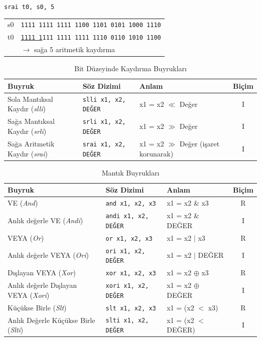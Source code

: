 \begin{center}\texttt{srai t0, s0, 5} \end{center}\vspace{-6pt}
\begin{center}
\small
\begin{tabular}{r@{\;\;}l}
  s0 & \texttt{1111\,1111\,1111\,1100\,1101\,0101\,1000\,1110} \\
  t0 & \texttt{\underline{1111\,1}111\,1111\,1111\,1110\,0110\,1010\,1100} \\
  & \hfill$\longrightarrow$ \textnormal{sağa 5 aritmetik kaydırma} \\
\end{tabular}
\end{center}

\begin{table}[htbp]
\centering
\caption{Bit Düzeyinde Kaydırma Buyrukları}
\label{tab:ari-kaydirma-buyruklar}
\begin{tabularx}{\textwidth}{l l X c}
\toprule
\textbf{Buyruk} & \textbf{Söz Dizimi} & \textbf{Anlam} & \textbf{Biçim} \\
\midrule
Sola Mantıksal Kaydır (\emph{slli}) & \texttt{slli x1, x2, DEĞER} & x1 = x2 $\ll$ Değer & I \\
Sağa Mantıksal Kaydır (\emph{srli}) & \texttt{srli x1, x2, DEĞER} & x1 = x2 $\gg$ Değer & I \\
Sağa Aritmetik Kaydır (\emph{srai}) & \texttt{srai x1, x2, DEĞER} & x1 = x2 $\gg$ Değer (işaret korunarak) & I \\
\bottomrule
\end{tabularx}
\end{table}

\begin{table}[htbp]
\centering
\caption{Mantık Buyrukları}
\label{tab:ari-mantik-buyruklar}
\begin{tabularx}{\textwidth}{l l X c}
\toprule
\textbf{Buyruk} & \textbf{Söz Dizimi} & \textbf{Anlam} & \textbf{Biçim} \\
\midrule
VE (\emph{And}) & \texttt{and x1, x2, x3} & x1 = x2 \& x3 & R \\
Anlık değerle VE (\emph{Andi}) & \texttt{andi x1, x2, DEĞER} & x1 = x2 \& DEĞER & I \\
VEYA (\emph{Or}) & \texttt{or x1, x2, x3} & x1 = x2 $|$ x3 & R \\
Anlık değerle VEYA (\emph{Ori}) & \texttt{ori x1, x2, DEĞER} & x1 = x2 $|$ DEĞER & I \\
Dışlayan VEYA (\emph{Xor}) & \texttt{xor x1, x2, x3} & x1 = x2 $\oplus$ x3 & R \\
Anlık değerle Dışlayan VEYA (\emph{Xori}) & \texttt{xori x1, x2, DEĞER} & x1 = x2 $\oplus$ DEĞER & I \\
Küçükse Birle (\emph{Slt}) & \texttt{slt x1, x2, x3} & x1 = (x2 $<$ x3) & R \\
Anlık Değerle Küçükse Birle (\emph{Slti}) & \texttt{slti x1, x2, DEĞER} & x1 = (x2 $<$ DEĞER) & I \\
\bottomrule
\end{tabularx}
\end{table}

